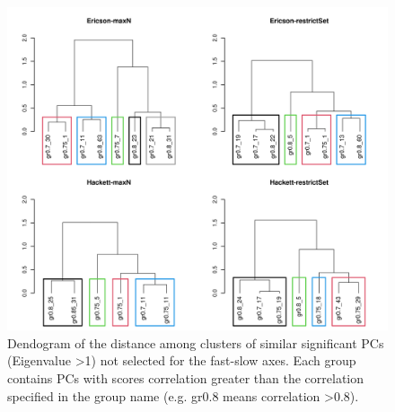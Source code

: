 \begin{figure}[ht!]
\centering
\includegraphics[width=.8\textwidth]{./Figures/Appendix2_1/2nd axes trees-1.png}
\caption[Cluster dendogram of the secondary axes]{
Dendogram of the distance among clusters of similar significant PCs (Eigenvalue
\textgreater{1}) not selected for the fast-slow axes. Each group contains PCs
with scores correlation greater than the correlation specified in the group name
(e.g. gr0.8 means correlation \textgreater{0.8}).}
\label{fig:figApp2.1.5}
\end{figure}
